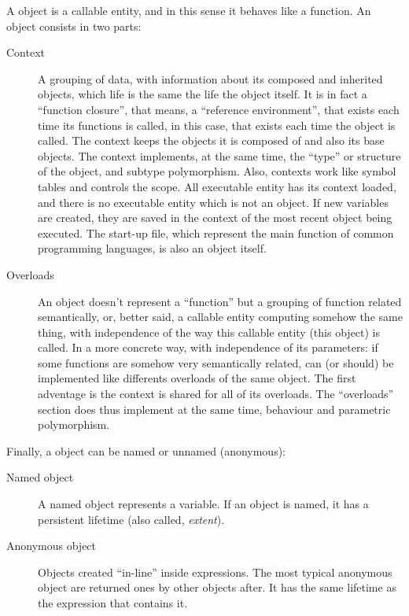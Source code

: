 \documentclass{article}
\begin{document}
A \faupp object is a callable entity, and in this sense it behaves like a
function. An object consists in two parts:

\begin{description}
  \item[Context] A grouping of data, with information about its composed and
    inherited objects, which life is the same the life the object itself. It is
    in fact a ``function closure'', that means, a ``reference environment'',
    that exists each time its functions is called, in this case, that exists
    each time the object is called. The context keeps the objects it is composed
    of and also its base objects. The context implements, at the same time, the
    ``type'' or structure of the object, and subtype polymorphism. Also,
    contexts work like symbol tables and controls the scope. All executable
    entity has its context loaded, and there is no executable entity which is
    not an object. If new variables are created, they are saved in the context
    of the most recent object being executed. The start-up file, which represent
    the main function of common programming languages, is also an object itself.
  \item[Overloads] An object doesn't represent a ``function'' but a grouping of
    function related semantically, or, better said, a callable entity computing
    somehow the same thing, with independence of the way this callable entity
    (this object) is called. In a more concrete way, with independence of its
    parameters: if some functions are somehow very semantically related, can (or
    should) be implemented like differents overloads of the same object. The
    first adventage is the context is shared for all of its overloads. The
    ``overloads'' section does thus implement at the same time, behaviour and
    parametric polymorphism.
\end{description}

Finally, a object can be named or unnamed (anonymous):

\begin{description}
  \item[Named object] A named object represents a variable. If an object is named,
    it has a persistent lifetime (also called, \textit{extent}).
  \item[Anonymous object] Objects created ``in-line'' inside expressions. The
    most typical anonymous object are returned ones by other objects after. It
    has the same lifetime as the expression that contains it.
\end{description}
\end{document}
